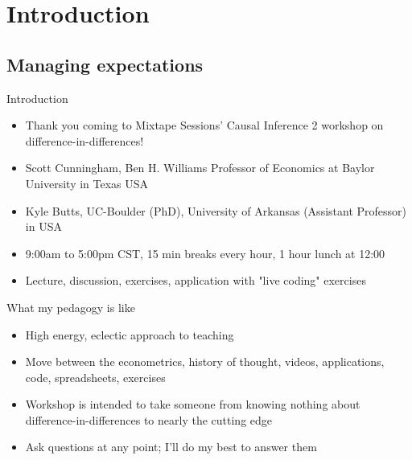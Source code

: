 \documentclass{beamer}
\begin{document}



\section{Introduction}

\subsection{Managing expectations}


\begin{frame}{Introduction}

\begin{itemize}
\item Thank you coming to Mixtape Sessions' Causal Inference 2 workshop on difference-in-differences!  
\item Scott Cunningham, Ben H. Williams Professor of Economics at Baylor University in Texas USA
\item Kyle Butts, UC-Boulder (PhD), University of Arkansas (Assistant Professor) in USA
\item 9:00am to 5:00pm CST, 15 min breaks every hour, 1 hour lunch at 12:00
\item Lecture, discussion, exercises, application with "live coding" exercises
\end{itemize}

\end{frame}


\begin{frame}{What my pedagogy is like}

\begin{itemize}
\item High energy, eclectic approach to teaching
\item Move between the econometrics, history of thought, videos, applications, code, spreadsheets, exercises
\item Workshop is intended to take someone from knowing nothing about difference-in-differences to nearly the cutting edge
\item Ask questions at any point; I'll do my best to answer them
\end{itemize}

\end{frame}
\end{document}
